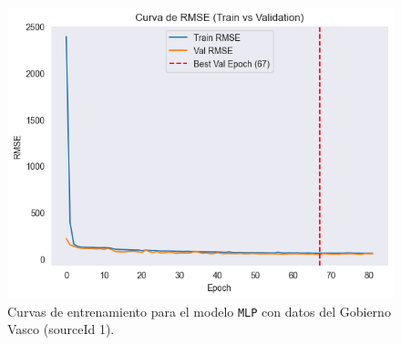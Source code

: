 \begin{figure}[H]
\begin{minipage}{0.48\textwidth}
		\vspace{0.2cm}
		\includegraphics[width=\linewidth]{includes/cap5/graphs/sid1_mlp_rmse.png}
	\end{minipage}
	\caption{Curvas de entrenamiento para el modelo \texttt{MLP} con datos del Gobierno Vasco (sourceId 1).}
	\label{fig:curvas_sid1_mlp}
\end{figure}

